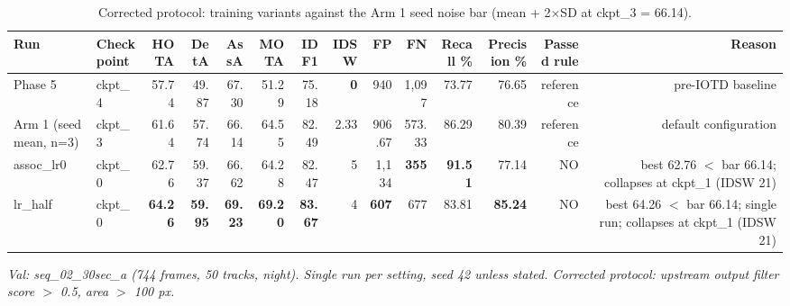 \begin{table}[t]
\centering
\small
\caption{Corrected protocol: training variants against the Arm 1 seed noise bar (mean + 2$\times$SD at ckpt\_3 = 66.14).}
\begin{tabular}{llrrrrrrrrrrrr}
\toprule
Run & Checkpoint & HOTA & DetA & AssA & MOTA & IDF1 & IDSW & FP & FN & Recall \% & Precision \% & Passed rule & Reason \\
\midrule
Phase 5 & ckpt\_4 & 57.74 & 49.87 & 67.30 & 51.29 & 75.18 & \textbf{0} & 940 & 1,097 & 73.77 & 76.65 & reference & pre-IOTD baseline \\
Arm 1 (seed mean, n=3) & ckpt\_3 & 61.64 & 57.74 & 66.14 & 64.55 & 82.49 & 2.33 & 906.67 & 573.33 & 86.29 & 80.39 & reference & default configuration \\
assoc\_lr0 & ckpt\_0 & 62.76 & 59.37 & 66.62 & 64.28 & 82.47 & 5 & 1,134 & \textbf{355} & \textbf{91.51} & 77.14 & NO & best 62.76 $<$ bar 66.14; collapses at ckpt\_1 (IDSW 21) \\
lr\_half & ckpt\_0 & \textbf{64.26} & \textbf{59.95} & \textbf{69.23} & \textbf{69.20} & \textbf{83.67} & 4 & \textbf{607} & 677 & 83.81 & \textbf{85.24} & NO & best 64.26 $<$ bar 66.14; single run; collapses at ckpt\_1 (IDSW 21) \\
\bottomrule
\end{tabular}
\par\smallskip\footnotesize\emph{Val: seq\_02\_30sec\_a (744 frames, 50 tracks, night). Single run per setting, seed 42 unless stated. Corrected protocol: upstream output filter score $>$ 0.5, area $>$ 100 px.}
\end{table}
